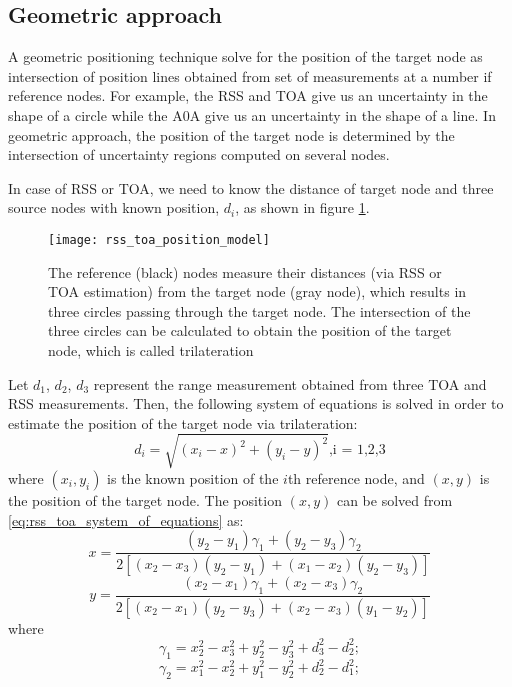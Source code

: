 \documentclass[../templatetop.tex]{subfiles}
\begin{document}
\subsection{Geometric approach}

A geometric positioning technique solve for the position of the target node as intersection of position lines obtained from set of measurements at a number if reference nodes. For example, the RSS and TOA give us an uncertainty in the shape of a circle while the A0A give us an uncertainty in the shape of a line. In geometric approach, the position of the target node is determined by the intersection of uncertainty regions computed on several nodes.

In case of RSS or TOA, we need to know the distance of target node and three source nodes with known position, $d_i$, as shown in figure \ref{fig:rss_toa_position_model}.

\begin{figure}[htbp]
    \centering
    \texttt{[image: rss\_toa\_position\_model]}
    \caption{The reference (black) nodes measure their distances (via RSS or TOA estimation) from the target node (gray node), which results in three circles passing through the target node. The intersection of the three circles can be calculated to obtain the position of the target node, which is called trilateration}
    \label{fig:rss_toa_position_model}
\end{figure}

Let $d_1$, $d_2$, $d_3$ represent the range measurement obtained from three TOA and RSS measurements. Then, the following system of equations is solved in order to estimate the position of the target node via trilateration:
\begin{equation}
    d_i = \sqrt{(x_i -x)^2 + (y_i - y)^2}  \mbox{,i = 1,2,3}
    \label{eq:rss_toa_system_of_equations}
\end{equation}
where $(x_i, y_i)$ is the known position of the $i$th reference node, and $(x,y)$ is the position of the target node.
The position $(x,y)$ can be solved from \ref{eq:rss_toa_system_of_equations} as:
\begin{equation}
    x = \frac{(y_2-y_1)\gamma_1 + (y_2-y_3)\gamma_2}{2[(x_2-x_3)(y_2-y_1) + (x_1-x_2)(y_2-y_3)]}
\end{equation}
\begin{equation}
    y = \frac{(x_2-x_1)\gamma_1 + (x_2-x_3)\gamma_2}{2[(x_2-x_1)(y_2-y_3) + (x_2-x_3)(y_1-y_2)]}
\end{equation}
where
\begin{equation}
    \gamma_1 = x_2^2 - x_3^2 + y_2^2 - y_3^2 + d_3^2 - d_2^2;
\end{equation}
\begin{equation}
    \gamma_2 = x_1^2 - x_2^2 + y_1^2 - y_2^2 + d_2^2 - d_1^2;
\end{equation}
\end{document}
